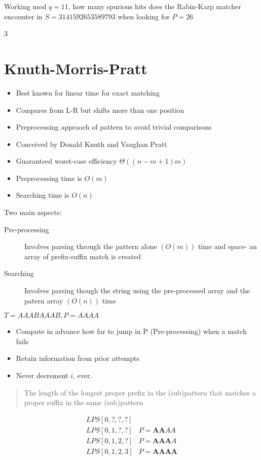 \documentclass{article}
\begin{document}
Working mod \(q = 11\), how many spurious hits does the Rabin-Karp matcher
encounter in \(S = 3141592653589793\) when looking for \(P = 26\)

3

\section*{Knuth-Morris-Pratt}
\begin{itemize}
    \item Best known for linear time for exact matching
    \item Compares from L-R but shifts more than one position
    \item Preprocessing appraoch of pattern to avoid trivial comparisons
    \item Conceived by Donald Knuth and Vaughan Pratt
    \item Guaranteed worst-case efficiency \(\Theta((n - m + 1) m)\)
    \item Preprocessing time is \(O(m)\)
    \item Searching time is \(O(n)\)
\end{itemize}

Two main aspects:
\begin{description}
    \item[Pre-processing]  Involves parsing through the pattern alone \((O(m))\)
        time and space- an array of prefix-suffix match is created
    \item[Searching] Involves parsing though the string using the pre-processed
        array and the patern array \((O(n))\) time
\end{description}

\(T= AAABAAAB, P=AAAA\)
\begin{itemize}
    \item Compute in advance how far to jump in P (Pre-processing) when a match
          fails
    \item Retain information from prior attempts
    \item Never decrement \(i\), ever.
\end{itemize}

\begin{quote}
    The length of the longest proper prefix in the (sub)pattern that matches a
    proper suffix in the same (sub)pattern
\end{quote}
\begin{align*}
    LPS[0,?,?,?] &                   \\
    LPS[0,1,?,?] & P = \mathbf{AA}AA \\
    LPS[0,1,2,?] & P = \mathbf{AAA}A \\
    LPS[0,1,2,3] & P = \mathbf{AAAA} \\
\end{align*}
\end{document}
